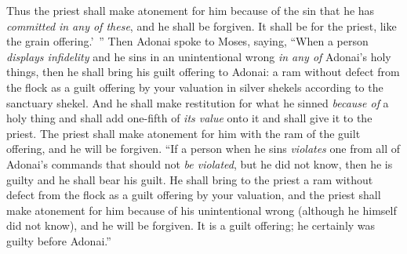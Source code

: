 \begin{biblechapter}
\verse Thus the priest shall make atonement for him because of the sin that he has \textit{committed} \textit{in any of these}, and he shall be forgiven. It shall be for the priest, like the grain offering.’ ”
 Then Adonai spoke to Moses, saying,
\verse “When a person \textit{displays infidelity} and he sins in an unintentional wrong \textit{in any of} Adonai’s holy things, then he shall bring his guilt offering to Adonai: a ram without defect from the flock as a guilt offering by your valuation in silver shekels according to the sanctuary shekel.
\verse And he shall make restitution for what he sinned \textit{because of} a holy thing and shall add one-fifth of \textit{its value} onto it and shall give it to the priest. The priest shall make atonement for him with the ram of the guilt offering, and he will be forgiven.
\verse “If a person when he sins \textit{violates} one from all of Adonai’s commands that should not \textit{be violated}, but he did not know, then he is guilty and he shall bear his guilt.
\verse He shall bring to the priest a ram without defect from the flock as a guilt offering by your valuation, and the priest shall make atonement for him because of his unintentional wrong (although he himself did not know), and he will be forgiven.
\verse It is a guilt offering; he certainly was guilty before Adonai.”
\end{biblechapter}

